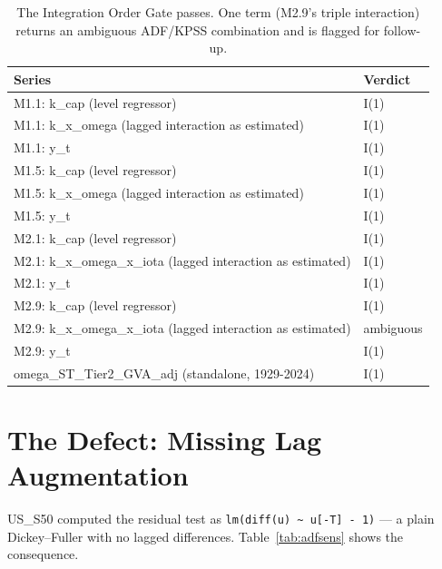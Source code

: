 \documentclass[11pt,a4paper]{article}
\begin{document}
\begin{table}[H]\centering\caption{Integration-order gap closure (ADF + KPSS, levels and first differences)}
\small\begin{tabular}{p{9.5cm}l}
\toprule
Series & Verdict \\
\midrule
M1.1: k\_cap (level regressor) & I(1) \\
M1.1: k\_x\_omega (lagged interaction as estimated) & I(1) \\
M1.1: y\_t & I(1) \\
M1.5: k\_cap (level regressor) & I(1) \\
M1.5: k\_x\_omega (lagged interaction as estimated) & I(1) \\
M1.5: y\_t & I(1) \\
M2.1: k\_cap (level regressor) & I(1) \\
M2.1: k\_x\_omega\_x\_iota (lagged interaction as estimated) & I(1) \\
M2.1: y\_t & I(1) \\
M2.9: k\_cap (level regressor) & I(1) \\
M2.9: k\_x\_omega\_x\_iota (lagged interaction as estimated) & ambiguous \\
M2.9: y\_t & I(1) \\
omega\_ST\_Tier2\_GVA\_adj (standalone, 1929-2024) & I(1) \\
\bottomrule
\end{tabular}
\caption*{\footnotesize The Integration Order Gate passes. One term (M2.9's triple interaction)  returns an ambiguous ADF/KPSS combination and is flagged for follow-up.}
\end{table}
\FloatBarrier
\section{The Defect: Missing Lag Augmentation}
US\_S50 computed the residual test as \texttt{lm(diff(u) \textasciitilde{} u[-T] - 1)} --- a plain Dickey--Fuller with no lagged differences. Table~\ref{tab:adfsens} shows the consequence.
\end{document}

